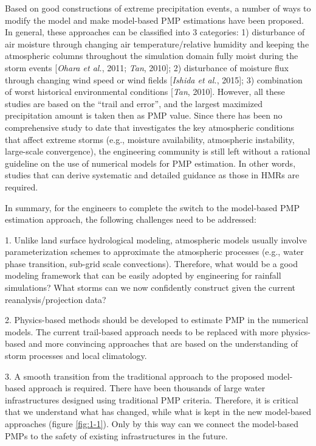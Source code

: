 Based on good constructions of extreme precipitation events, a number of ways to modify the model and make model-based PMP estimations have been proposed. In general, these approaches can be classified into 3 categories: 1) disturbance of air moisture through changing air temperature/relative humidity and keeping the atmospheric columns throughout the simulation domain fully moist during the storm events [\textit{Ohara et al.}, 2011; \textit{Tan}, 2010]; 2) disturbance of moisture flux through changing wind speed or wind fields [\textit{Ishida et al.}, 2015]; 3) combination of worst historical environmental conditions [\textit{Tan}, 2010]. However, all these studies are based on the ``trail and error'', and the largest maximized precipitation amount is taken then as PMP value. Since there has been no comprehensive study to date that investigates the key atmospheric conditions that affect extreme storms (e.g., moisture availability, atmospheric instability, large-scale convergence), the engineering community is still left without a rational guideline on the use of numerical models for PMP estimation. In other words, studies that can derive systematic and detailed guidance as those in HMRs are required.

In summary, for the engineers to complete the switch to the model-based PMP estimation approach, the following challenges need to be addressed:

1. Unlike land surface hydrological modeling, atmospheric models usually involve parameterization schemes to approximate the atmospheric processes (e.g., water phase transition, sub-grid scale convections). Therefore, what would be a good modeling framework that can be easily adopted by engineering for rainfall simulations? What storms can we now confidently construct given the current reanalysis/projection data?

2. Physics-based methods should be developed to estimate PMP in the numerical models. The current trail-based approach needs to be replaced with more physics-based and more convincing approaches that are based on the understanding of storm processes and local climatology.

3. A smooth transition from the traditional approach to the proposed model-based approach is required. There have been thousands of large water infrastructures designed using traditional PMP criteria. Therefore, it is critical that we understand what has changed, while what is kept in the new model-based approaches (figure \ref{fig:1-1}). Only by this way can we connect the model-based PMPs to the safety of existing infrastructures in the future.


